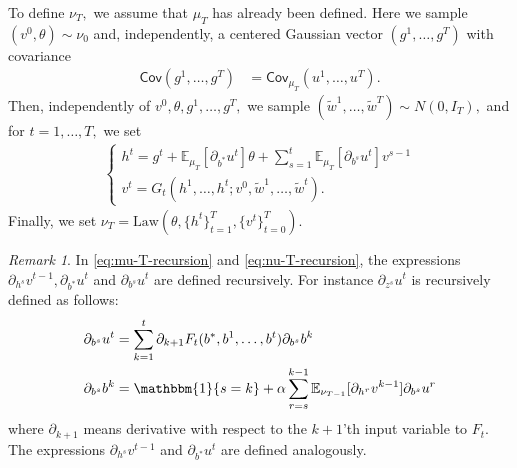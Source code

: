 \documentclass{article}
\newcommand{\1}{\mathbbm{1}}
\theoremstyle{plain}
\theoremstyle{definition}
\theoremstyle{remark}
\newtheorem{remark}[theorem]{Remark}
\newcommand{\E}{\mathbb{E}}
\newcommand{\Law}{\mathrm{Law}}
\newcommand{\Cov}{\mathsf{Cov}}
\begin{document}
To define $\nu_T,$ we assume that $\mu_T$ has already been defined. Here we sample $(v^0,\theta) \sim \nu_0$ and, independently, a centered Gaussian vector $(g^1,\dots,g^T)$ with covariance
\begin{align}\label{eq:mu-T-covariance}
    \Cov(g^1,\dots,g^T) &= \Cov_{\mu_T}(u^1,\dots,u^T).
\end{align}
Then, independently of $v^0,\theta,g^1,\dots,g^T,$ we sample $(\tilde{w}^1,\dots,\tilde{w}^T)\sim N(0,I_T),$ and for $t=1,\dots,T,$ we set
\begin{align}\label{eq:nu-T-recursion}
    \begin{cases}
        h^t = g^t + \E_{\mu_T}[\partial_{b^*}u^t] \theta + \sum_{s=1}^t \E_{\mu_T}[\partial_{b^s}u^t] v^{s-1} \\
        v^t = G_t(h^1,\dots,h^t;v^0,\tilde{w}^1,\dots,\tilde{w}^t).
    \end{cases}
\end{align}
Finally, we set $\nu_T = \Law(\theta, \{h^t\}_{t=1}^T, \{v^t\}_{t=0}^T)$.


\begin{remark}\label{rem:meaning-of-field-derivatives-in-dmft}
    In \eqref{eq:mu-T-recursion} and \eqref{eq:nu-T-recursion}, the expressions $\partial_{h^s} v^{t-1},\partial_{b^*}u^t$ and $\partial_{b^s}u^t$ are defined recursively. For instance $\partial_{z^s}u^t$ is recursively defined as follows:
    \begin{align*}
        \partial_{b^s}u^t &= \sum_{k=1}^t \partial_{k+1}F_t(b^*,b^1,\dots,b^t) \partial_{b^s} b^k \\
        \partial_{b^s} b^k &= \1\{s=k\} + \alpha \sum_{r=s}^{k-1} \E_{\nu_{T-1}}[\partial_{h^{r}} v^{k-1}]\partial_{b^s} u^{r}
    \end{align*}
    where $\partial_{k+1}$ means derivative with respect to the $k+1$'th input variable to $F_t.$ The expressions $\partial_{h^s} v^{t-1}$ and $\partial_{b^*}u^t$ are defined analogously.
\end{remark}
\end{document}
